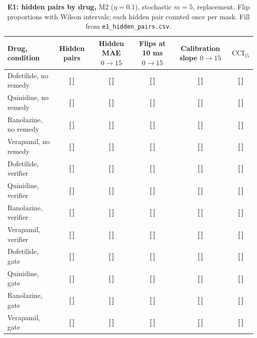 \documentclass[11pt,a4paper]{article}
\newcommand{\T}{{\color{red}\textbf{[\,]}}}
\newcommand{\CCI}{\mathrm{CCI}}
\begin{document}
\FloatBarrier
\begin{table}[!htbp]\centering\footnotesize
\caption{\textbf{E1: hidden pairs by drug,} M2 ($\eta=0.1$), stochastic $m=5$, replacement. Flip proportions with Wilson intervals; each hidden pair counted once per mask. Fill from \texttt{e1\_hidden\_pairs.csv}.}
\begin{tabularx}{\textwidth}{@{}p{3.9cm} C C C C C@{}}\toprule
Drug, condition & Hidden pairs & Hidden MAE $0\to15$ & Flips at 10 ms $0\to15$ & Calibration slope $0\to15$ & $\CCI_{15}$\\\midrule
Dofetilide, no remedy & \T & \T & \T & \T & \T\\
Quinidine, no remedy & \T & \T & \T & \T & \T\\
Ranolazine, no remedy & \T & \T & \T & \T & \T\\
Verapamil, no remedy & \T & \T & \T & \T & \T\\
\midrule
Dofetilide, verifier & \T & \T & \T & \T & \T\\
Quinidine, verifier & \T & \T & \T & \T & \T\\
Ranolazine, verifier & \T & \T & \T & \T & \T\\
Verapamil, verifier & \T & \T & \T & \T & \T\\
\midrule
Dofetilide, gate & \T & \T & \T & \T & \T\\
Quinidine, gate & \T & \T & \T & \T & \T\\
Ranolazine, gate & \T & \T & \T & \T & \T\\
Verapamil, gate & \T & \T & \T & \T & \T\\
\bottomrule\end{tabularx}
\end{table}
\FloatBarrier
\end{document}
